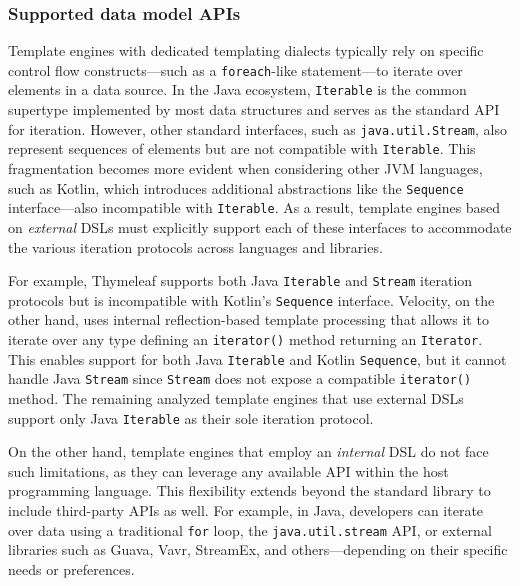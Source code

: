 \subsubsection{Supported data model APIs}

Template engines with dedicated templating dialects typically rely on specific
control flow constructs—such as a \texttt{foreach}-like statement—to iterate
over elements in a data source. In the Java ecosystem, \texttt{Iterable} is the
common supertype implemented by most data structures and serves as the standard
API for iteration. However, other standard interfaces, such as
\texttt{java.util.Stream}, also represent sequences of elements but are not
compatible with \texttt{Iterable}. This fragmentation becomes more evident when
considering other JVM languages, such as Kotlin, which introduces additional
abstractions like the \texttt{Sequence} interface—also incompatible with
\texttt{Iterable}. As a result, template engines based on \textit{external}
DSLs must explicitly support each of these interfaces to accommodate the
various iteration protocols across languages and libraries.

For example, Thymeleaf supports both Java \texttt{Iterable} and \texttt{Stream}
iteration protocols but is incompatible with Kotlin's \texttt{Sequence}
interface.
Velocity, on the other hand, uses internal reflection-based template processing
that allows it to iterate over any type defining an \texttt{iterator()} method
returning an \texttt{Iterator}. This enables support for both Java
\texttt{Iterable} and Kotlin \texttt{Sequence}, but it cannot handle Java
\texttt{Stream} since \texttt{Stream} does not expose a compatible
\texttt{iterator()} method.
The remaining analyzed template engines that use external DSLs support only Java
\texttt{Iterable} as their sole iteration protocol.

On the other hand, template engines that employ an \textit{internal} DSL do not
face such limitations, as they can leverage any available API within the host
programming language. This flexibility extends beyond the standard library to
include third-party APIs as well. For example, in Java, developers can iterate
over data using a traditional \texttt{for} loop, the \texttt{java.util.stream}
API, or external libraries such as Guava, Vavr, StreamEx, and others—depending
on their specific needs or preferences.


